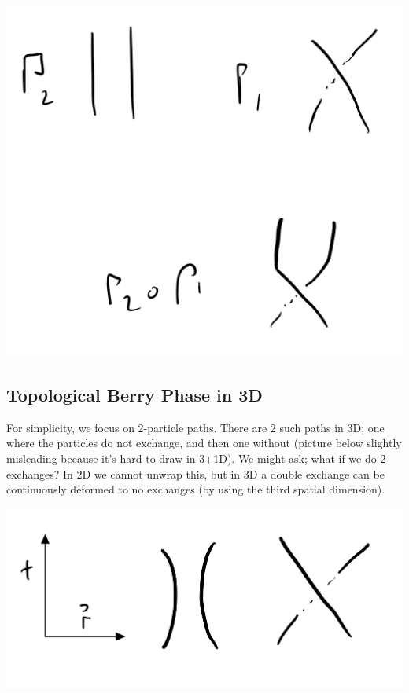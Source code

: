\begin{center}
    \includegraphics[scale=0.3]{Lectures/Images/lec5-pathcomp.png}
\end{center}

\subsection{Topological Berry Phase in 3D}
For simplicity, we focus on 2-particle paths. There are 2 such paths in 3D; one where the particles do not exchange, and then one without (picture below slightly misleading because it's hard to draw in 3+1D). We might ask; what if we do 2 exchanges? In 2D we cannot unwrap this, but in 3D a double exchange can be continuously deformed to no exchanges (by using the third spatial dimension).

\begin{center}
    \includegraphics[scale=0.35]{Lectures/Images/lec5-3dbraids.png}
\end{center}

